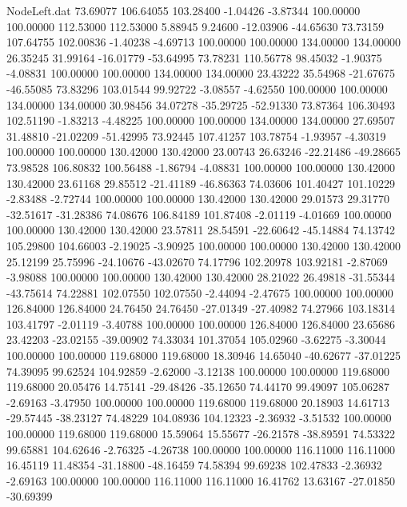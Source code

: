 \begin{filecontents}{NodeLeft.dat}
  73.69077  106.64055  103.28400    -1.04426   -3.87344  100.00000  100.00000  112.53000  112.53000    5.88945    9.24600  -12.03906  -44.65630
  73.73159  107.64755  102.00836    -1.40238   -4.69713  100.00000  100.00000  134.00000  134.00000   26.35245   31.99164  -16.01779  -53.64995
  73.78231  110.56778   98.45032    -1.90375   -4.08831  100.00000  100.00000  134.00000  134.00000   23.43222   35.54968  -21.67675  -46.55085
  73.83296  103.01544   99.92722    -3.08557   -4.62550  100.00000  100.00000  134.00000  134.00000   30.98456   34.07278  -35.29725  -52.91330
  73.87364  106.30493  102.51190    -1.83213   -4.48225  100.00000  100.00000  134.00000  134.00000   27.69507   31.48810  -21.02209  -51.42995
  73.92445  107.41257  103.78754    -1.93957   -4.30319  100.00000  100.00000  130.42000  130.42000   23.00743   26.63246  -22.21486  -49.28665
  73.98528  106.80832  100.56488    -1.86794   -4.08831  100.00000  100.00000  130.42000  130.42000   23.61168   29.85512  -21.41189  -46.86363
  74.03606  101.40427  101.10229    -2.83488   -2.72744  100.00000  100.00000  130.42000  130.42000   29.01573   29.31770  -32.51617  -31.28386
  74.08676  106.84189  101.87408    -2.01119   -4.01669  100.00000  100.00000  130.42000  130.42000   23.57811   28.54591  -22.60642  -45.14884
  74.13742  105.29800  104.66003    -2.19025   -3.90925  100.00000  100.00000  130.42000  130.42000   25.12199   25.75996  -24.10676  -43.02670
  74.17796  102.20978  103.92181    -2.87069   -3.98088  100.00000  100.00000  130.42000  130.42000   28.21022   26.49818  -31.55344  -43.75614
  74.22881  102.07550  102.07550    -2.44094   -2.47675  100.00000  100.00000  126.84000  126.84000   24.76450   24.76450  -27.01349  -27.40982
  74.27966  103.18314  103.41797    -2.01119   -3.40788  100.00000  100.00000  126.84000  126.84000   23.65686   23.42203  -23.02155  -39.00902
  74.33034  101.37054  105.02960    -3.62275   -3.30044  100.00000  100.00000  119.68000  119.68000   18.30946   14.65040  -40.62677  -37.01225
  74.39095   99.62524  104.92859    -2.62000   -3.12138  100.00000  100.00000  119.68000  119.68000   20.05476   14.75141  -29.48426  -35.12650
  74.44170   99.49097  105.06287    -2.69163   -3.47950  100.00000  100.00000  119.68000  119.68000   20.18903   14.61713  -29.57445  -38.23127
  74.48229  104.08936  104.12323    -2.36932   -3.51532  100.00000  100.00000  119.68000  119.68000   15.59064   15.55677  -26.21578  -38.89591
  74.53322   99.65881  104.62646    -2.76325   -4.26738  100.00000  100.00000  116.11000  116.11000   16.45119   11.48354  -31.18800  -48.16459
  74.58394   99.69238  102.47833    -2.36932   -2.69163  100.00000  100.00000  116.11000  116.11000   16.41762   13.63167  -27.01850  -30.69399

\end{filecontents}
